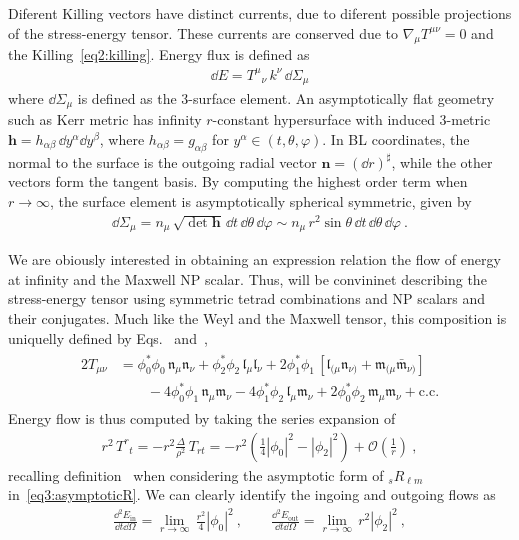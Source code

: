 Diferent Killing vectors have distinct currents, due to diferent possible projections of the stress-energy tensor.
These currents are conserved due to $\nabla_\mu T^{\mu\nu}=0$ and the Killing~\eqref{eq2:killing}.
Energy flux is defined as
\begin{align}
    \label{eq3:fluxE}
    \dd E = T^{\mu}{}_\nu \, k^\nu \,\dd\Sigma_\mu
\end{align}
where $\dd \Sigma_\mu$ is defined as the 3-surface element.
An asymptotically flat geometry such as Kerr metric has infinity $r$-constant hypersurface with induced 3-metric $\bm{h} = h_{\alpha\beta} \,\dd y^\alpha \dd y^\beta$, where $h_{\alpha\beta} = g_{\alpha\beta}$ for $y^\alpha \in (t, \theta, \varphi)$.
In BL coordinates, the normal to the surface is the outgoing radial vector $\bm{n}=(\dd r)^\sharp$, while the other vectors form the tangent basis.
By computing the  highest order term when $r\to\infty$, the surface element is asymptotically spherical symmetric, given by
\begin{align}
    \label{eq3:radial3SurfaceElement}
    \dd\Sigma_\mu = n_\mu \,\sqrt{\det{\bm{h}}} \,\dd t \,\dd \theta \,\dd \varphi \sim n_\mu \,r^2 \sin\theta \,\dd t \,\dd \theta \,\dd \varphi ~.
\end{align}

We are obiously interested in obtaining an expression relation the flow of energy at infinity and the Maxwell NP scalar. Thus, will be convininet describing the stress-energy tensor using symmetric tetrad combinations and NP scalars and their conjugates. Much like the Weyl and the Maxwell tensor, this composition is uniquelly defined by Eqs.~ and~,
\begin{align}
    \begin{split}
    2 T_{\mu\nu} &= \phi_0^* \phi_0 \, \mathfrak{n}_\mu \mathfrak{n}_\nu + \phi_2^* \phi_2 \, \mathfrak{l}_\mu \mathfrak{l}_\nu + 2 \phi_1^* \phi_1 \, [ \mathfrak{l}_{(\mu} \mathfrak{n}_{\nu)} + \mathfrak{m}_{(\mu} \bar{\mathfrak{m}}_{\nu)} ] \\
    &\qquad - 4 \phi_0^* \phi_1 \, \mathfrak{n}_\mu \mathfrak{m}_\nu - 4 \phi_1^* \phi_2 \, \mathfrak{l}_\mu \mathfrak{m}_\nu + 2 \phi_0^* \phi_2 \, \mathfrak{m}_\mu \mathfrak{m}_\nu + \text{c.c.}
    \end{split}
    \label{eq3:stressEnergyPhi}
\end{align}
Energy flow is thus computed by taking the series expansion of
\begin{align}
    r^2 \,T^{r}{}_t = - r^2 \frac{\Delta}{\rho^2} \,T_{rt} = - r^2 \left(\frac{1}{4} |\phi_0|^2 - |\phi_2|^2\right) + \mathscr{O}\left(\frac{1}{r}\right) ~,
\end{align}
recalling definition~ when considering the asymptotic form of ${}_{s}R_{\ell m}$ in~\eqref{eq3:asymptoticR}.
We can clearly identify the ingoing and outgoing flows as
\begin{align}
    \frac{\dd^2 E_\mathrm{in}}{\dd t \dd\Omega} = \lim_{r\to\infty} \,\frac{r^2}{4} |\phi_0|^2 ~,\qquad \frac{\dd^2 E_\mathrm{out}}{\dd t \dd\Omega} = \lim_{r\to\infty} \, r^2 |\phi_2|^2 ~,
\end{align}

